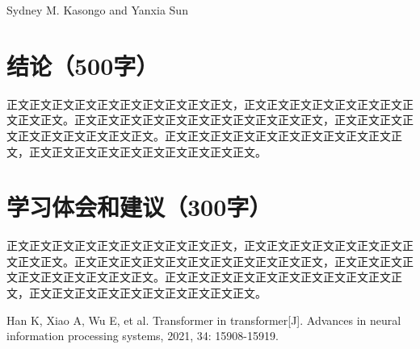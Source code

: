 \documentclass{article}
\begin{document}
Sydney M. Kasongo  and Yanxia Sun





\section{结论（500字）}
正文正文正文正文正文正文正文正文正文正文，正文正文正文正文正文正文正文正文正文正文。正文正文正文正文正文正文正文正文正文正文正文，正文正文正文正文正文正文正文正文正文正文。正文正文正文正文正文正文正文正文正文正文正文，正文正文正文正文正文正文正文正文正文正文。

\section{学习体会和建议（300字）}
正文正文正文正文正文正文正文正文正文正文，正文正文正文正文正文正文正文正文正文正文。正文正文正文正文正文正文正文正文正文正文正文，正文正文正文正文正文正文正文正文正文正文。正文正文正文正文正文正文正文正文正文正文正文，正文正文正文正文正文正文正文正文正文正文。

\begin{thebibliography}{10}

Han K, Xiao A, Wu E, et al. Transformer in transformer[J]. Advances in neural information processing systems, 2021, 34: 15908-15919.
\end{thebibliography}

\newpage{}
\appendix
\end{document}
